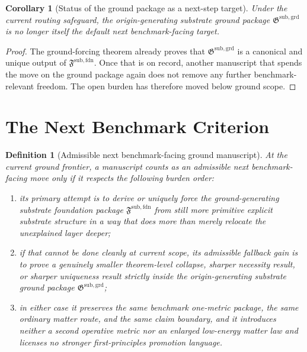 \documentclass[11pt]{article}
\newcommand{\GroundPackage}{\mathfrak G^{\mathrm{sub,grd}}}
\newcommand{\FoundationPackage}{\mathfrak F^{\mathrm{sub,fdn}}}
\newtheorem{definition}{Definition}
\newtheorem{corollary}{Corollary}
\begin{document}
\begin{corollary}[Status of the ground package as a next-step target]
Under the current routing safeguard, the origin-generating substrate ground package \(\GroundPackage\) is no longer itself the default next benchmark-facing target.
\end{corollary}

\begin{proof}
The ground-forcing theorem already proves that \(\GroundPackage\) is a canonical and unique output of \(\FoundationPackage\). Once that is on record, another manuscript that spends the move on the ground package again does not remove any further benchmark-relevant freedom. The open burden has therefore moved below ground scope.
\end{proof}

\section{The Next Benchmark Criterion}

\begin{definition}[Admissible next benchmark-facing ground manuscript]
At the current ground frontier, a manuscript counts as an admissible next benchmark-facing move only if it respects the following burden order:
\begin{enumerate}
    \item its primary attempt is to derive or uniquely force the ground-generating substrate foundation package \(\FoundationPackage\) from still more primitive explicit substrate structure in a way that does more than merely relocate the unexplained layer deeper;
    \item if that cannot be done cleanly at current scope, its admissible fallback gain is to prove a genuinely smaller theorem-level collapse, sharper necessity result, or sharper uniqueness result strictly inside the origin-generating substrate ground package \(\GroundPackage\);
    \item in either case it preserves the same benchmark one-metric package, the same ordinary matter route, and the same claim boundary, and it introduces neither a second operative metric nor an enlarged low-energy matter law and licenses no stronger first-principles promotion language.
\end{enumerate}
\end{definition}
\end{document}
